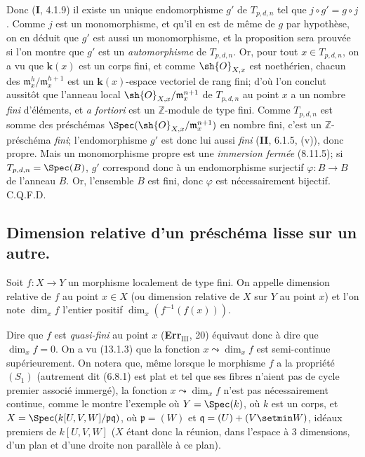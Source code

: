 Donc (\textbf{I}, 4.1.9) il existe un unique endomorphisme $g'$ de $T_{p,d,n}$ tel que $j\circ g'=g\circ j$. Comme $j$ est un monomorphisme, et qu'il en est de même de $g$ par hypothèse, on en déduit que $g'$ est aussi un monomorphisme, et la proposition sera prouvée si l'on montre que $g'$ est un \emph{automorphisme} de $T_{p,d,n}$. Or, pour tout $x\in T_{p,d,n}$, on a vu que $\boldsymbol{k}(x)$ est un corps fini, et comme $\sh{O}_{X,x}$ est noethérien, chacun des $\mathfrak m_x^h/\mathfrak m_x^{h+1}$ est un $\boldsymbol{k}(x)$-espace vectoriel de rang fini; d'où l'on conclut aussitôt que l'anneau local $\sh{O}_{X,x}/\mathfrak m_x^{n+1}$ de $T_{p,d,n}$ au point $x$ a un nombre \emph{fini} d'éléments, et \emph{a fortiori} est un $\mathbb{Z}$-module de type fini. Comme $T_{p,d,n}$ est somme des préschémas $\Spec(\sh{O}_{X,x}/\mathfrak m_x^{n+1})$ en nombre fini, c'est un $\mathbb{Z}$-préschéma \emph{fini}; l'endomorphisme $g'$ est donc lui aussi \emph{fini} (\textbf{II}, 6.1.5, (v)), donc propre. Mais un monomorphisme propre est une \emph{immersion fermée} (8.11.5); si $T_{p,d,n}=\Spec(B)$, $g'$ correspond donc à un endomorphisme surjectif $\varphi:B\to B$ de l'anneau $B$. Or, l'ensemble $B$ est fini, donc $\varphi$ est nécessairement bijectif. C.Q.F.D.

\subsection{Dimension relative d'un préschéma lisse sur un autre.}

\begin{definition}[17.10.1]
Soit $f:X\to Y$ un morphisme localement de type fini. On appelle dimension relative de $f$ au point $x\in X$ (ou dimension relative de $X$ sur $Y$ au point $x$) et l'on note $\dim_x f$ l'entier positif $\dim_x(f^{-1}(f(x)))$.
\end{definition}

Dire que $f$ est \emph{quasi-fini} au point $x$ (\textbf{Err}$_{\mathrm{III}}$, 20) équivaut donc à dire que $\dim_x f=0$. On a vu (13.1.3) que la fonction $x\leadsto\dim_x f$ est semi-continue supérieurement. On notera que, même lorsque le morphisme $f$ a la propriété $(S_1)$ (autrement dit (6.8.1) est plat et tel que ses fibres n'aient pas de cycle premier associé immergé), la fonction $x\leadsto\dim_x f$ n'est pas nécessairement continue, comme le montre l'exemple où $Y=\Spec(k)$, où $k$ est un corps, et $X=\Spec(k[U,V,W]/\mathfrak p\mathfrak q)$, où $\mathfrak p=(W)$ et $\mathfrak q=(U)+(V\setmin W)$, idéaux premiers de $k[U,V,W]$ ($X$ étant donc la réunion, dans l'espace à 3 dimensions, d'un plan et d'une droite non parallèle à ce plan).

